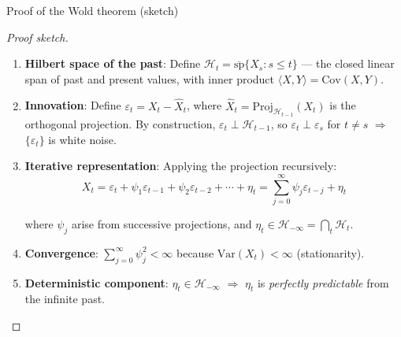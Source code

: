 \documentclass[9pt, aspectratio=169, t]{beamer}
\begin{document}
\begin{frame}{Proof of the Wold theorem (sketch)}
    {\footnotesize
    \begin{proof}[\footnotesize Proof sketch]
    \vspace{-1mm}
    \begin{enumerate}\setlength{\itemsep}{1pt}
        \item \textbf{Hilbert space of the past}: Define $\mathcal{H}_t = \overline{\mathrm{sp}}\{X_s : s \leq t\}$ --- the closed linear span of past and present values, with inner product $\langle X, Y \rangle = \mathrm{Cov}(X,Y)$.

        \item \textbf{Innovation}: Define $\varepsilon_t = X_t - \hat{X}_t$, where $\hat{X}_t = \mathrm{Proj}_{\mathcal{H}_{t-1}}(X_t)$ is the orthogonal projection. By construction, $\varepsilon_t \perp \mathcal{H}_{t-1}$, so $\varepsilon_t \perp \varepsilon_s$ for $t \neq s$ $\Rightarrow$ $\{\varepsilon_t\}$ is white noise.

        \item \textbf{Iterative representation}: Applying the projection recursively:
        \vspace{-1mm}
        \[
            X_t = \varepsilon_t + \psi_1 \varepsilon_{t-1} + \psi_2 \varepsilon_{t-2} + \cdots + \eta_t = \sum_{j=0}^{\infty} \psi_j \varepsilon_{t-j} + \eta_t
        \]
        \vspace{-3mm}

        where $\psi_j$ arise from successive projections, and $\eta_t \in \mathcal{H}_{-\infty} = \bigcap_{t} \mathcal{H}_t$.

        \item \textbf{Convergence}: $\sum_{j=0}^{\infty} \psi_j^2 < \infty$ because $\mathrm{Var}(X_t) < \infty$ (stationarity).

        \item \textbf{Deterministic component}: $\eta_t \in \mathcal{H}_{-\infty}$ $\Rightarrow$ $\eta_t$ is \textit{perfectly predictable} from the infinite past.\qedhere
    \end{enumerate}
    \end{proof}
    }
\end{frame}
\end{document}
